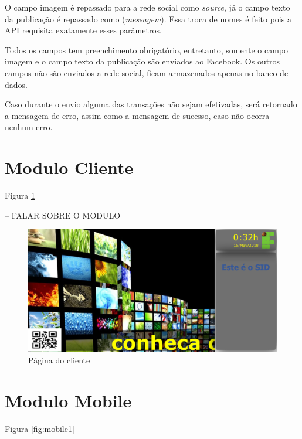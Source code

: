O campo imagem é repassado para a rede social como \textit{source}, já o campo texto da publicação é repassado como (\textit{messagem}). Essa troca de nomes é feito pois a API requisita exatamente esses parâmetros.

Todos os campos tem preenchimento obrigatório, entretanto, somente o campo imagem e o campo texto da publicação são enviados ao Facebook. Os outros campos não são enviados a rede social, ficam armazenados apenas no banco de dados.

Caso durante o envio alguma das transações não sejam efetivadas, será retornado a mensagem de erro, assim como a mensagem de sucesso, caso não ocorra nenhum erro.

\section{Modulo Cliente}
Figura \ref{fig:cliente1}

-- FALAR SOBRE O MODULO

\begin{figure}[H]
\centering
\includegraphics[scale=0.4]{figuras/cliente1}
\caption{Página do cliente}
\label{fig:cliente1}
\end{figure}


\section{Modulo Mobile}
Figura \ref{fig:mobile1}

 
